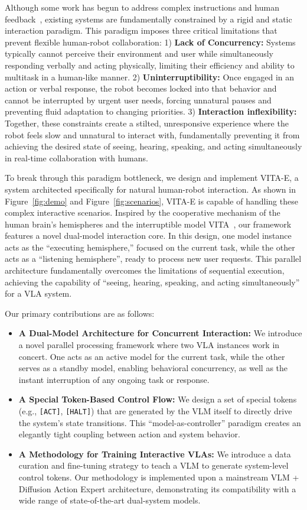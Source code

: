 Although some work has begun to address complex instructions and human feedback~\citep{hirobot, saycan, yay, switchvla}, existing systems are fundamentally constrained by a rigid and static interaction paradigm. This paradigm imposes three critical limitations that prevent flexible human-robot collaboration: 1) \textbf{Lack of Concurrency:} Systems typically cannot perceive their environment and user while simultaneously responding verbally and acting physically, limiting their efficiency and ability to multitask in a human-like manner. 2) \textbf{Uninterruptibility:} Once engaged in an action or verbal response, the robot becomes locked into that behavior and cannot be interrupted by urgent user needs, forcing unnatural pauses and preventing fluid adaptation to changing priorities. 3) \textbf{Interaction inflexibility:} Together, these constraints create a stilted, unresponsive experience where the robot feels slow and unnatural to interact with, fundamentally preventing it from achieving the desired state of seeing, hearing, speaking, and acting simultaneously in real-time collaboration with humans.

To break through this paradigm bottleneck, we design and implement VITA-E, a system architected specifically for natural human-robot interaction. As shown in Figure~\ref{fig:demo} and Figure~\ref{fig:scenarios}, VITA-E is capable of handling these complex interactive scenarios. Inspired by the cooperative mechanism of the human brain's hemispheres and the interruptible model VITA~\citep{vita}, our framework features a novel dual-model interaction core. In this design, one model instance acts as the ``executing hemisphere,'' focused on the current task, while the other acts as a ``listening hemisphere'', ready to process new user requests. This parallel architecture fundamentally overcomes the limitations of sequential execution, achieving the capability of ``seeing, hearing, speaking, and acting simultaneously'' for a VLA system.

Our primary contributions are as follows:
\begin{itemize}
    \item \textbf{A Dual-Model Architecture for Concurrent Interaction:} We introduce a novel parallel processing framework where two VLA instances work in concert. One acts as an active model for the current task, while the other serves as a standby model, enabling behavioral concurrency, as well as the instant interruption of any ongoing task or response.
    \item \textbf{A Special Token-Based Control Flow:} We design a set of special tokens (e.g., \texttt{[ACT]}, \texttt{[HALT]}) that are generated by the VLM itself to directly drive the system's state transitions. This ``model-as-controller'' paradigm creates an elegantly tight coupling between action and system behavior.
    \item \textbf{A Methodology for Training Interactive VLAs:} We introduce a data curation and fine-tuning strategy to teach a VLM to generate system-level control tokens. Our methodology is implemented upon a mainstream VLM + Diffusion Action Expert architecture, demonstrating its compatibility with a wide range of state-of-the-art dual-system models.
\end{itemize}
